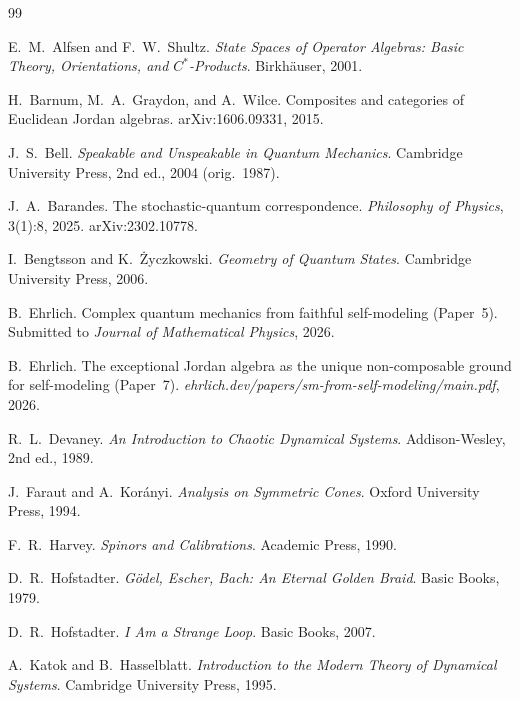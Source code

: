 \documentclass[12pt]{article}
\theoremstyle{remark}
\begin{document}
\begin{thebibliography}{99}

E.~M.~Alfsen and F.~W.~Shultz.
\newblock \emph{State Spaces of Operator Algebras: Basic Theory, Orientations, and $C^*$-Products}.
\newblock Birkh\"auser, 2001.

H.~Barnum, M.~A.~Graydon, and A.~Wilce.
\newblock Composites and categories of {E}uclidean {J}ordan algebras.
\newblock arXiv:1606.09331, 2015.

J.~S.~Bell.
\newblock \emph{Speakable and Unspeakable in Quantum Mechanics}.
\newblock Cambridge University Press, 2nd ed., 2004 (orig.\ 1987).

J.~A.~Barandes.
\newblock The stochastic-quantum correspondence.
\newblock \emph{Philosophy of Physics}, 3(1):8, 2025.
\newblock arXiv:2302.10778.

I.~Bengtsson and K.~\.Zyczkowski.
\newblock \emph{Geometry of Quantum States}.
\newblock Cambridge University Press, 2006.

B.~Ehrlich.
\newblock Complex quantum mechanics from faithful self-modeling (Paper~5).
\newblock Submitted to \emph{Journal of Mathematical Physics}, 2026.

B.~Ehrlich.
\newblock The exceptional Jordan algebra as the unique non-composable ground for self-modeling (Paper~7).
\newblock \emph{ehrlich.dev/papers/sm-from-self-modeling/main.pdf}, 2026.

R.~L.~Devaney.
\newblock \emph{An Introduction to Chaotic Dynamical Systems}.
\newblock Addison-Wesley, 2nd ed., 1989.

J.~Faraut and A.~Kor\'anyi.
\newblock \emph{Analysis on Symmetric Cones}.
\newblock Oxford University Press, 1994.

F.~R.~Harvey.
\newblock \emph{Spinors and Calibrations}.
\newblock Academic Press, 1990.

D.~R.~Hofstadter.
\newblock \emph{G\"odel, Escher, Bach: An Eternal Golden Braid}.
\newblock Basic Books, 1979.

D.~R.~Hofstadter.
\newblock \emph{I Am a Strange Loop}.
\newblock Basic Books, 2007.

A.~Katok and B.~Hasselblatt.
\newblock \emph{Introduction to the Modern Theory of Dynamical Systems}.
\newblock Cambridge University Press, 1995.


\end{thebibliography}
\end{document}
